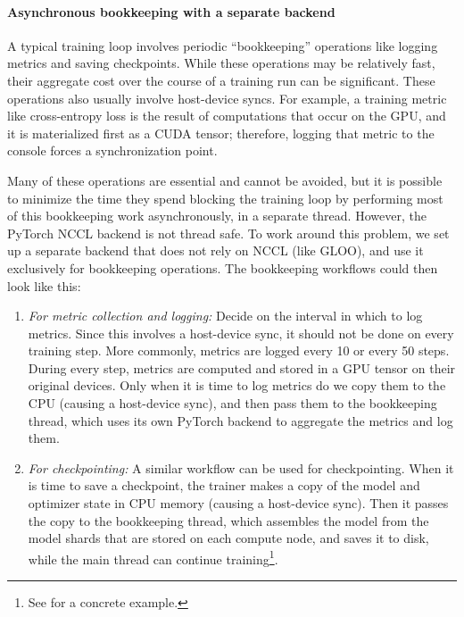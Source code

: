 \documentclass[table]{ai2style/ai2}
\begin{document}
\paragraph{Asynchronous bookkeeping with a separate backend}
A typical training loop involves periodic ``bookkeeping'' operations like logging metrics and saving checkpoints.
While these operations may be relatively fast, their aggregate cost over the course of a training run can be significant.
These operations also usually involve host-device syncs. 
For example, a training metric like cross-entropy loss is the result of computations that occur on the GPU, and it is materialized first as a CUDA tensor; 
therefore, logging that metric to the console forces a synchronization point.

Many of these operations are essential and cannot be avoided, but it is possible to minimize the time they spend blocking the training loop by performing most of this bookkeeping work asynchronously, in a separate thread.
However, the PyTorch NCCL backend is not thread safe.
To work around this problem, we set up a separate backend that does not rely on NCCL (like GLOO), and use it exclusively for bookkeeping operations.
The bookkeeping workflows could then look like this:

\begin{enumerate}
    \item \textit{For metric collection and logging:}
        Decide on the interval in which to log metrics.
        Since this involves a host-device sync, it should not be done on every training step.
        More commonly, metrics are logged every 10 or every 50 steps.
        During every step, metrics are computed and stored in a GPU tensor on their original devices.
        Only when it is time to log metrics do we copy them to the CPU (causing a host-device sync), and then pass them to the bookkeeping thread, which uses its own PyTorch backend to aggregate the metrics and log them.
    \item \textit{For checkpointing:}
        A similar workflow can be used for checkpointing.
        When it is time to save a checkpoint, the trainer makes a copy of the model and optimizer state in CPU memory (causing a host-device sync). Then it passes the copy to the bookkeeping thread, which assembles the model from the model shards that are stored on each compute node, and saves it to disk, while the main thread can continue training\footnote{See \href{https://pytorch.org/blog/reducing-checkpointing-times/}{} for a concrete example.}.
\end{enumerate}
\end{document}
